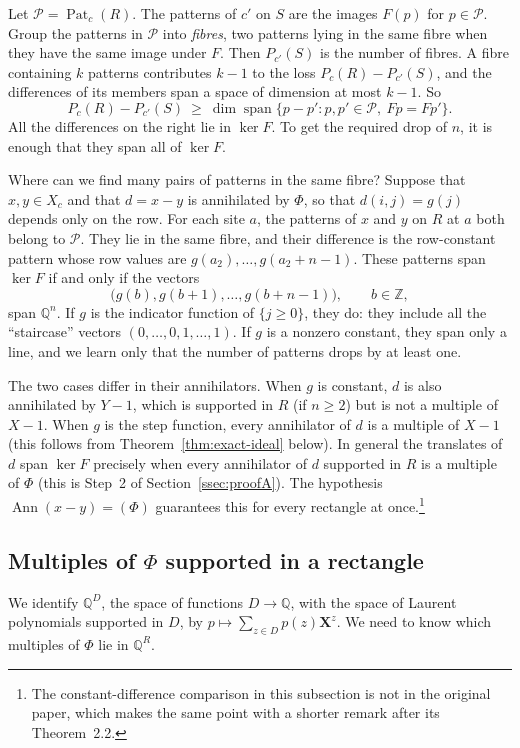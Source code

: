 \documentclass[11pt,a4paper,reqno]{amsart}
\theoremstyle{definition}
\theoremstyle{remark}
\newcommand{\Z}{\mathbb Z}
\newcommand{\Q}{\mathbb Q}
\newcommand{\mon}[1]{\boldsymbol X^{#1}}
\DeclareMathOperator{\Ann}{Ann}
\DeclareMathOperator{\Pat}{Pat}
\DeclareMathOperator{\spanQ}{span}
\numberwithin{equation}{section}
\begin{document}
Let $\mathcal P=\Pat_c(R)$. The patterns of $c'$ on $S$ are the images $F(p)$ for $p\in\mathcal P$. Group the patterns in $\mathcal P$ into \emph{fibres}, two patterns lying in the same fibre when they have the same image under $F$. Then $P_{c'}(S)$ is the number of fibres. A fibre containing $k$ patterns contributes $k-1$ to the loss $P_c(R)-P_{c'}(S)$, and the differences of its members span a space of dimension at most $k-1$. So
\[
 P_c(R)-P_{c'}(S)\ \ge\ \dim\spanQ\{p-p': p,p'\in\mathcal P,\ Fp=Fp'\}.
\]
All the differences on the right lie in $\ker F$. To get the required drop of $n$, it is enough that they span all of $\ker F$.

Where can we find many pairs of patterns in the same fibre? Suppose that $x,y\in X_c$ and that $d=x-y$ is annihilated by $\Phi$, so that $d(i,j)=g(j)$ depends only on the row. For each site $a$, the patterns of $x$ and $y$ on $R$ at $a$ both belong to $\mathcal P$. They lie in the same fibre, and their difference is the row-constant pattern whose row values are $g(a_2),\ldots,g(a_2+n-1)$. These patterns span $\ker F$ if and only if the vectors
\[
 \bigl(g(b),g(b+1),\ldots,g(b+n-1)\bigr),\qquad b\in\Z,
\]
span $\Q^n$. If $g$ is the indicator function of $\{j\ge0\}$, they do: they include all the ``staircase'' vectors $(0,\ldots,0,1,\ldots,1)$. If $g$ is a nonzero constant, they span only a line, and we learn only that the number of patterns drops by at least one.

The two cases differ in their annihilators. When $g$ is constant, $d$ is also annihilated by $Y-1$, which is supported in $R$ (if $n\ge2$) but is not a multiple of $X-1$. When $g$ is the step function, every annihilator of $d$ is a multiple of $X-1$ (this follows from Theorem~\ref{thm:exact-ideal} below). In general the translates of $d$ span $\ker F$ precisely when every annihilator of $d$ supported in $R$ is a multiple of $\Phi$ (this is Step~2 of Section~\ref{ssec:proofA}). The hypothesis $\Ann(x-y)=(\Phi)$ guarantees this for every rectangle at once.\footnote{The constant-difference comparison in this subsection is not in the original paper, which makes the same point with a shorter remark after its Theorem~2.2.}

\subsection{Multiples of \texorpdfstring{$\Phi$}{Phi} supported in a rectangle}
We identify $\Q^D$, the space of functions $D\to\Q$, with the space of Laurent polynomials supported in $D$, by $p\mapsto\sum_{z\in D}p(z)\mon z$. We need to know which multiples of $\Phi$ lie in $\Q^R$.
\end{document}
